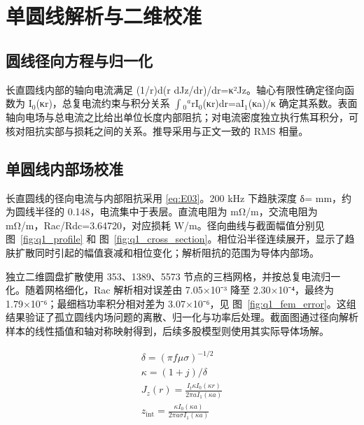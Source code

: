 \section{单圆线解析与二维校准}
\label{chapter:03}

\hypertarget{03.round_derivation.heading}{}
\subsection{圆线径向方程与归一化}

\hypertarget{03.round_derivation.p1}{}
长直圆线内部的轴向电流满足 (1/r)d(r dJz/dr)/dr=κ²Jz。轴心有限性确定径向函数为 I\(_0\)(κr)，总复电流约束与积分关系 \(\int\)\(_0\)\(^a\)rI\(_0\)(κr)dr=aI\(_1\)(κa)/κ 确定其系数。表面轴向电场与总电流之比给出单位长度内部阻抗；对电流密度独立执行焦耳积分，可核对阻抗实部与损耗之间的关系。推导采用与正文一致的 RMS 相量。

\hypertarget{03.analytic.heading}{}
\subsection{单圆线内部场校准}

\hypertarget{03.analytic.p1}{}
长直圆线的径向电流与内部阻抗采用 \eqref{eq:E03}。200 kHz 下趋肤深度 δ= mm，约为圆线半径的 0.148，电流集中于表层。直流电阻为  mΩ/m，交流电阻为  mΩ/m，Rac/Rdc=3.64720，对应损耗  W/m。径向曲线与截面幅值分别见 图~\ref{fig:q1_profile} 和 图~\ref{fig:q1_cross_section}。相位沿半径连续展开，显示了趋肤扩散同时引起的幅值衰减和相位变化；解析阻抗的范围为导体内部场。

\hypertarget{03.analytic.p2}{}
独立二维圆盘扩散使用 353、1389、5573 节点的三档网格，并按总复电流归一化。随着网格细化，Rac 解析相对误差由 7.05×10⁻³ 降至 2.30×10⁻⁴，最终为 1.79×10⁻⁶；最细档功率积分相对差为 3.07×10⁻⁶，见 图~\ref{fig:q1_fem_error}。这组结果验证了孤立圆线内场问题的离散、归一化与功率后处理。截面图通过径向解析样本的线性插值和轴对称映射得到，后续多股模型则使用其实际导体场解。

\hypertarget{03.equation.E03}{}
\hypertarget{E03}{}
\begin{equation}
\begin{gathered}
\delta=(\pi f\mu\sigma)^{-1/2} \\
\kappa=(1+j)/\delta \\
J_z(r)=\frac{I_t\kappa I_0(\kappa r)}{2\pi a I_1(\kappa a)} \\
z_{\mathrm{int}}=\frac{\kappa I_0(\kappa a)}{2\pi a\sigma I_1(\kappa a)}
\end{gathered}
\tag{3}\label{eq:E03}
\end{equation}

